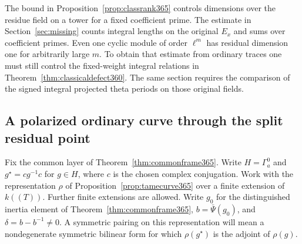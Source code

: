\documentclass[a4paper,11pt]{article}
\theoremstyle{definition}
\theoremstyle{remark}
\numberwithin{equation}{section}
\begin{document}
The bound in Proposition~\ref{prop:classrank365} controls
dimensions over the residue field on a tower for a fixed
coefficient prime. The estimate in Section~\ref{sec:missing}
counts integral lengths on the original \(E_x\) and sums
over coefficient primes. Even one cyclic module of order
\(\ell^m\) has residual dimension one for arbitrarily large
\(m\). To obtain that estimate from ordinary traces one
must still control the fixed-weight integral relations in
Theorem~\ref{thm:classicaldefect360}. The same section
requires the comparison of the signed integral projected
theta periods on those original fields.


\subsection{A polarized ordinary curve through the split residual point}
\label{sec:markedcurve366}

Fix the common layer of Theorem~\ref{thm:commonframe365}.
Write \(H=\Gamma_a^0\) and \(g^\star=cg^{-1}c\) for \(g\in H\),
where \(c\) is the chosen complex conjugation. Work with the
representation \(\rho\) of Proposition~\ref{prop:tamecurve365}
over a finite extension of \(k((T))\). Further finite extensions
are allowed. Write \(g_0\) for the distinguished inertia element
of Theorem~\ref{thm:commonframe365}, \(b=\bar\Psi(g_0)\), and
\(\delta=b-b^{-1}\ne0\). A symmetric pairing on this
representation will mean a nondegenerate symmetric bilinear form
for which \(\rho(g^\star)\) is the adjoint of \(\rho(g)\).
\end{document}
